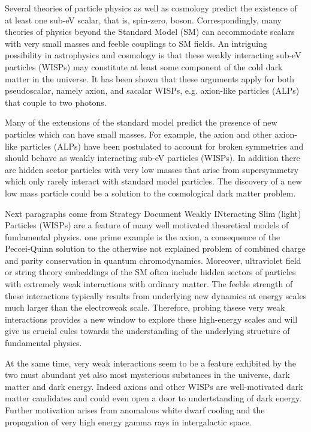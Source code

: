 \documentclass[11pt]{book}
\begin{document}
Several theories of particle physics as well as cosmology predict the existence of at least one sub-eV scalar, that is, spin-zero, boson. Correspondingly, many theories of physics beyond the Standard Model (SM) can accommodate scalars with very small masses and feeble couplings to SM fields. An  intriguing possibility in astrophysics and cosmology is that these weakly interacting sub-eV particles (WISPs) may constitute at least some component of the cold dark matter in the universe. It has been shown that these arguments apply for both pseudoscalar, namely axion, and sacalar WISPs, e.g. axion-like particles (ALPs) that couple to two photons.

Many of the extensions of the standard model predict the presence of new particles which can have small masses. For example, the axion and other axion-like particles (ALPs) have been postulated to account for broken symmetries and should behave as weakly interacting sub-eV particles (WISPs). In addition there are hidden sector particles with very low masses that arise from supersymmetry which only rarely interact with standard model particles. The discovery of a new low mass particle  could be a solution to the cosmological dark matter problem.

{\color{blue} Next paragraphs come from Strategy Document}
Weakly INteracting Slim (light) Particles (WISPs) are a feature of many well motivated theoretical models of fundamental physics. one prime example is the axion, a consequence of the Peccei-Quinn solution to the otherwise not explained problem of combined charge and parity conservation in quantum chromodynamics. Moreover, ultraviolet field or string theory embeddings of the SM often include hidden sectors of particles with extremely weak interactions with ordinary matter. The feeble strength of these interactions typically results from underlying new dynamics at energy scales much larger than the electroweak scale. Therefore, probing thsese very weak interactions provides a new window to explore these high-energy scales and will give us crucial cules towards the understanding of the underlying structure of fundamental physics.

At the same time, very weak interactions seem to be a feature exhibited by the two must abundant yet also most mysterious substances in the universe, dark matter and dark energy. Indeed axions and other WISPs are well-motivated dark matter candidates and could even open a door to undertstanding of dark energy. Further motivation arises from anomalous white dwarf cooling and the propagation of very high energy gamma rays in intergalactic space.
\end{document}
